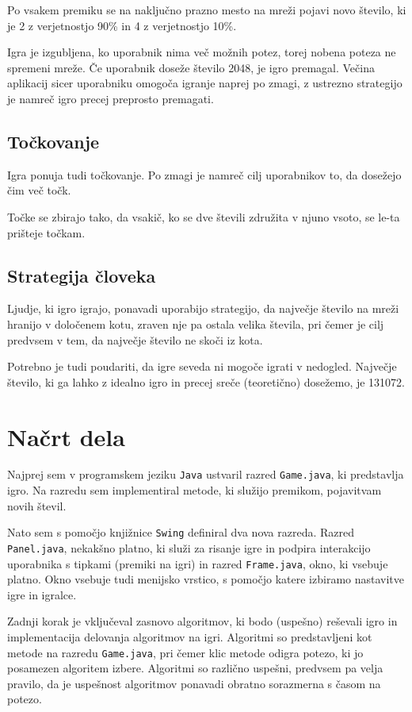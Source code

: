 \documentclass{article}
\begin{document}
Po vsakem premiku se na naključno prazno mesto na mreži pojavi novo število, ki je 2 z verjetnostjo 90\% in 4 z verjetnostjo 10\%.

Igra je izgubljena, ko uporabnik nima več možnih potez, torej nobena poteza ne spremeni mreže. Če uporabnik doseže število 2048, je igro premagal. Večina aplikacij sicer uporabniku omogoča igranje naprej po zmagi, z ustrezno strategijo je namreč igro precej preprosto premagati.

\subsection{Točkovanje}

Igra ponuja tudi točkovanje. Po zmagi je namreč cilj uporabnikov to, da dosežejo čim več točk.

Točke se zbirajo tako, da vsakič, ko se dve števili združita v njuno vsoto, se le-ta prišteje točkam.

\subsection{Strategija človeka}

Ljudje, ki igro igrajo, ponavadi uporabijo strategijo, da največje število na mreži hranijo v določenem kotu, zraven nje pa ostala velika števila, pri čemer je cilj predvsem v tem, da največje število ne skoči iz kota.

Potrebno je tudi poudariti, da igre seveda ni mogoče igrati v nedogled. Največje število, ki ga lahko z idealno igro in precej sreče (teoretično) dosežemo, je 131072.

\section{Načrt dela}

Najprej sem v programskem jeziku \texttt{Java} ustvaril razred \texttt{Game.java}, ki predstavlja igro. Na razredu sem implementiral metode, ki služijo premikom, pojavitvam novih števil.

Nato sem s pomočjo knjižnice \texttt{Swing} definiral dva nova razreda. Razred \texttt{Panel.java}, nekakšno platno, ki služi za risanje igre in podpira interakcijo uporabnika s tipkami (premiki na igri) in razred \texttt{Frame.java}, okno, ki vsebuje platno. Okno vsebuje tudi menijsko vrstico, s pomočjo katere izbiramo nastavitve igre in igralce.

Zadnji korak je vključeval zasnovo algoritmov, ki bodo (uspešno) reševali igro in implementacija delovanja algoritmov na igri. Algoritmi so predstavljeni kot metode na razredu \texttt{Game.java}, pri čemer klic metode odigra potezo, ki jo posamezen algoritem izbere. Algoritmi so različno uspešni, predvsem pa velja pravilo, da je uspešnost algoritmov ponavadi obratno sorazmerna s časom na potezo. 
\end{document}

